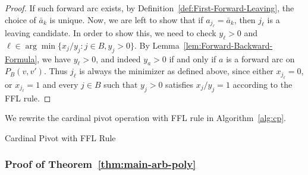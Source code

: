 \documentclass[11pt]{article}
\begin{document}
\begin{proof}
    If such forward arc exists, by Definition~\ref{def:First-Forward-Leaving}, the choice of $\bar{a}_k$ is unique. Now, we are left to show that if $a_{j_\ell}=\bar{a}_k$, then $j_\ell$ is a leaving candidate. In order to show this, we need to check $y_{\ell}>0$ and $\ell\in\arg\min\{x_j/y_j:j\in B,y_j>0\}$. By Lemma~\ref{lem:Forward-Backward-Formula}, we have $y_{\ell}>0$, and indeed $y_a>0$ if and only if $a$ is a forward arc on $P_B(v,v')$. Thus $j_\ell$ is always the minimizer as defined above, since either $x_{j_\ell}=0$, or $x_{j_\ell}=1$ and every $j\in B$ such that $y_j>0$ satisfies $x_j/y_j=1$ according to the FFL rule.
\fi
\end{proof}
We rewrite the cardinal pivot operation with FFL rule in Algorithm~\ref{alg:cp}.
\begin{algorithm}
\caption{Cardinal Pivot with FFL Rule}\label{alg:cp}
\begin{algorithmic}
\Else 
{}
\EndIf
{}
\end{algorithmic}
\end{algorithm}


































\subsubsection{Proof of Theorem~\ref{thm:main-arb-poly}}\label{sec:run-time}
\end{document}
